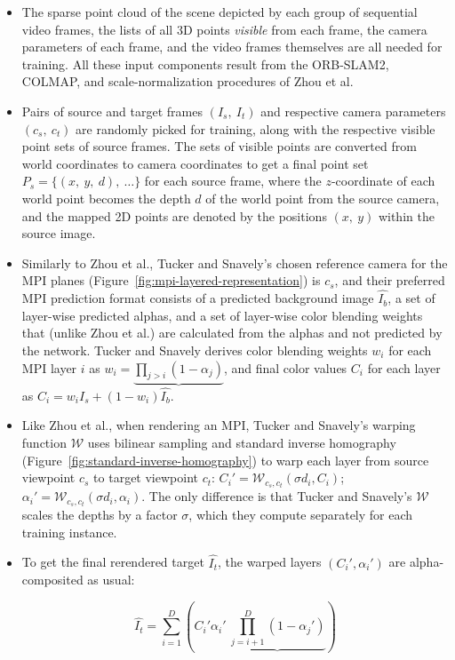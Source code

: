 \begin{itemize}
    \item The sparse point cloud of the scene depicted by each group of sequential video frames, the lists of all 3D points \textit{visible} from each frame, the camera parameters of each frame, and the video frames themselves are all needed for training. All these input components result from the ORB-SLAM2, COLMAP, and scale-normalization procedures of Zhou et al.
    \item Pairs of source and target frames $(I_s,\ I_t)$ and respective camera parameters $(c_s,\ c_t)$ are randomly picked for training, along with the respective visible point sets of source frames. The sets of visible points are converted from world coordinates to camera coordinates to get a final point set $P_s = \{(x,\ y,\ d),\ \ldots\}$ for each source frame, where the $z$-coordinate of each world point becomes the depth $d$ of the world point from the source camera, and the mapped 2D points are denoted by the positions $(x,\ y)$ within the source image. 
    \item Similarly to Zhou et al., Tucker and Snavely's chosen reference camera for the MPI planes (Figure~\ref{fig:mpi-layered-representation}) is $c_s$, and their preferred MPI prediction format consists of a predicted background image $\hat{I_b}$, a set of layer-wise predicted alphas, and a set of layer-wise color blending weights that (unlike Zhou et al.) are calculated from the alphas and not predicted by the network. Tucker and Snavely derives color blending weights $w_i$ for each MPI layer $i$ as $w_i = \underbrace{\prod_{j>i} (1 - \alpha_j)}$, and final color values $C_i$ for each layer as $C_i = w_i I_s + (1 - w_i) \hat{I_b}$.
    \item Like Zhou et al., when rendering an MPI, Tucker and Snavely's warping function $\mathcal{W}$ uses bilinear sampling and standard inverse homography (Figure~\ref{fig:standard-inverse-homography}) to warp each layer from source viewpoint $c_s$ to target viewpoint $c_t$: $C_i' = \mathcal{W}_{c_s, c_t}(\sigma d_i, C_i)$; $\alpha_i' = \mathcal{W}_{c_s, c_t}(\sigma d_i, \alpha_i)$. The only difference is that Tucker and Snavely's $\mathcal{W}$ scales the depths by a factor $\sigma$, which they compute separately for each training instance.
    \item To get the final rerendered target $\hat{I_t}$, the warped layers $(C_i', \alpha_i')$ are alpha-composited as usual:
    
    \begin{equation}\label{eq:rerendered-target}
    \hat{I_t} = \sum_{i=1}^D \left(C_i' \alpha_i'\ \underbrace{\prod_{j=i+1}^D (1 - \alpha_j')}\right)
    \end{equation}
    

\end{itemize}
